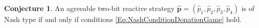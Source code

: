 \documentclass{article}
\theoremstyle{definition}
\newtheorem{conjecture}[theorem]{Conjecture}
\begin{document}
\begin{conjecture}\label{conjecture:nash_from_numerical_results}
An agreeable two-bit reactive strategy \(\mathbf{\hat{p}} = (\hat{p}_{1}, \hat{p}_{2}, \hat{p}_{3}, \hat{p}_{4})\) is of Nash type if and only if conditions \eqref{Eq:NashConditionDonationGame} hold. 
\end{conjecture}


\end{document}
